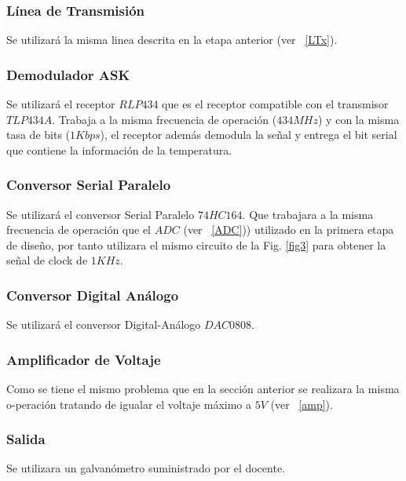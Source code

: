 \documentclass[twocolumn]{IEEEtran}
\begin{document}
\subsubsection{Línea de Transmisión}
\noindent
Se utilizará la misma linea descrita en la etapa anterior (ver  ~\ref{LTx}).

\subsubsection{Demodulador ASK}
\noindent
Se utilizará el receptor $RLP434$ que es el receptor compatible con el transmisor $TLP434A$. Trabaja a la misma frecuencia de operación ($434 MHz$) y con la misma tasa de bits ($1Kbps$), el receptor además demodula la señal y entrega el bit serial que contiene la información de la temperatura.

\subsubsection{Conversor Serial Paralelo}
\noindent
Se utilizará el conversor Serial Paralelo $74HC164$. Que trabajara a la misma frecuencia de operación que el $ADC$ (ver  ~\ref{ADC})) utilizado en la primera etapa de diseño, por tanto utilizara el mismo circuito de la Fig. \ref{fig3} para obtener la señal de clock de $1KHz$.

\subsubsection{Conversor Digital Análogo}
\noindent
Se utilizará el conversor Digital-Análogo $DAC0808$.

\subsubsection{Amplificador de Voltaje}
\noindent
Como se tiene el mismo problema que en la sección anterior se realizara la misma o-peración tratando de igualar el voltaje máximo a $5V$ (ver  ~\ref{amp}).

\subsubsection{Salida}
\noindent
Se utilizara un galvanómetro suministrado por el docente.
\end{document}
